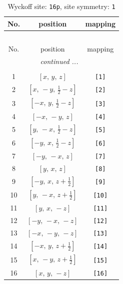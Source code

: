 \documentclass[fleqn,8pt]{jsarticle}
\begin{document}
\begin{longtable}{ccc}
\caption{Wyckoff site: {\tt 16p}, site symmetry: {\tt 1}}
 \\
 \hline \hline
No. & position & mapping \\ \hline \endfirsthead

\multicolumn{2}{l}{\tablename\ \thetable{}} \\
 \hline \hline
No. & position & mapping \\ \hline \endhead

 \hline \hline
\multicolumn{2}{r}{\footnotesize\it continued ...} \\ \endfoot

 \hline \hline
\multicolumn{2}{r}{} \\ \endlastfoot

1 & $\left[ x,\, y,\, z \right]$ & {\tt [1]} \\ \hline
2 & $\left[ x,\, - y,\, \frac{1}{2} - z \right]$ & {\tt [2]} \\ \hline
3 & $\left[ - x,\, y,\, \frac{1}{2} - z \right]$ & {\tt [3]} \\ \hline
4 & $\left[ - x,\, - y,\, z \right]$ & {\tt [4]} \\ \hline
5 & $\left[ y,\, - x,\, \frac{1}{2} - z \right]$ & {\tt [5]} \\ \hline
6 & $\left[ - y,\, x,\, \frac{1}{2} - z \right]$ & {\tt [6]} \\ \hline
7 & $\left[ - y,\, - x,\, z \right]$ & {\tt [7]} \\ \hline
8 & $\left[ y,\, x,\, z \right]$ & {\tt [8]} \\ \hline
9 & $\left[ - y,\, x,\, z + \frac{1}{2} \right]$ & {\tt [9]} \\ \hline
10 & $\left[ y,\, - x,\, z + \frac{1}{2} \right]$ & {\tt [10]} \\ \hline
11 & $\left[ y,\, x,\, - z \right]$ & {\tt [11]} \\ \hline
12 & $\left[ - y,\, - x,\, - z \right]$ & {\tt [12]} \\ \hline
13 & $\left[ - x,\, - y,\, - z \right]$ & {\tt [13]} \\ \hline
14 & $\left[ - x,\, y,\, z + \frac{1}{2} \right]$ & {\tt [14]} \\ \hline
15 & $\left[ x,\, - y,\, z + \frac{1}{2} \right]$ & {\tt [15]} \\ \hline
16 & $\left[ x,\, y,\, - z \right]$ & {\tt [16]} \\
\end{longtable}
\end{document}
